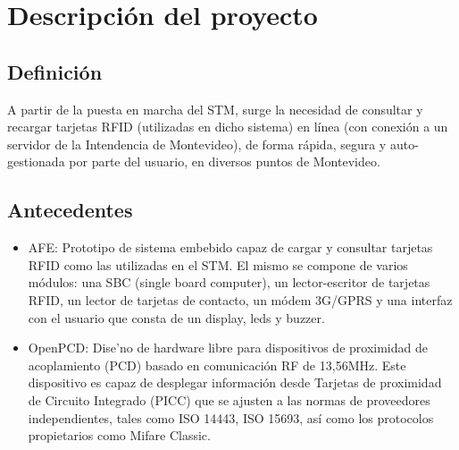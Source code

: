 \chapter{Descripci\'on del proyecto}

\section{Definici\'on}

A partir de la puesta en marcha del STM, surge la necesidad de consultar y recargar tarjetas RFID (utilizadas en dicho sistema) en l\'inea (con conexi\'on a un servidor de la Intendencia de Montevideo), de forma r\'apida, segura y auto-gestionada por parte del usuario, en diversos puntos de Montevideo.

\section{Antecedentes}

\begin{itemize}

\item AFE: Prototipo de sistema embebido capaz de cargar y consultar tarjetas RFID como las utilizadas en el STM. El mismo se compone de varios m\'odulos: una SBC (single board computer), un lector-escritor de tarjetas RFID, un lector de tarjetas de contacto, un m\'odem 3G/GPRS y una interfaz con el usuario que consta de un display, leds y buzzer.

\item OpenPCD: Dise'no de hardware libre para dispositivos de proximidad de acoplamiento (PCD) basado en comunicaci\'on RF de 13,56MHz. Este dispositivo es capaz de desplegar informaci\'on desde Tarjetas de proximidad de Circuito Integrado (PICC) que se ajusten a las normas de proveedores independientes, tales como ISO 14443, ISO 15693, as\'i como los protocolos propietarios como Mifare Classic.

\end{itemize}